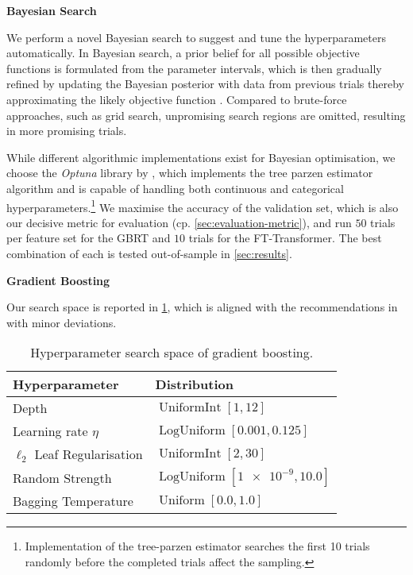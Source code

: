 \textbf{Bayesian Search}

We perform a novel Bayesian search to suggest and tune the hyperparameters automatically. In Bayesian search, a prior belief for all possible objective functions is formulated from the parameter intervals, which is then gradually refined by updating the Bayesian posterior with data from previous trials thereby approximating the likely objective function \autocite[][2]{shahriariTakingHumanOut2016}. Compared to brute-force approaches, such as grid search, unpromising search regions are omitted, resulting in more promising trials.

While different algorithmic implementations exist for Bayesian optimisation, we choose the \emph{Optuna} library by \textcite[][1--10]{akibaOptunaNextgenerationHyperparameter2019}, which implements the tree parzen estimator algorithm and is capable of handling both continuous and categorical hyperparameters.\footnote{Implementation of the tree-parzen estimator searches the first 10 trials randomly before the completed trials affect the sampling.} We maximise the accuracy of the validation set, which is also our decisive metric for evaluation (cp. \cref{sec:evaluation-metric}), and run $\num{50}$ trials per feature set for the \gls{GBRT} and $\num{10}$ trials for the FT-Transformer. The best combination of each is tested out-of-sample in \cref{sec:results}.

\textbf{Gradient Boosting}

Our search space is reported in \cref{tab:hyperparameter-space-gbm}, which is aligned with the recommendations in \textcites[][20]{prokhorenkovaCatBoostUnbiasedBoosting2018}[][18]{gorishniyRevisitingDeepLearning2021}[][4]{rubachevRevisitingPretrainingObjectives2022} with minor deviations.

\begin{table}[H]
    \centering
    \caption[Hyperparameter Search Space of Gradient Boosting]{Hyperparameter search space of gradient boosting.}
    \label{tab:hyperparameter-space-gbm}
    \begin{tabular}{@{}ll@{}}
        \toprule
        Hyperparameter               & Distribution                                  \\ \midrule
        Depth                        & $\operatorname{UniformInt}[1,12]$             \\
        Learning rate $\eta$         & $\operatorname{LogUniform}[0.001, 0.125]$     \\
        $\ell_2$ Leaf Regularisation & $\operatorname{UniformInt}[2, 30]$            \\
        Random Strength              & $\operatorname{LogUniform}[\num{1e-9}, 10.0]$ \\
        Bagging Temperature          & $\operatorname{Uniform}[0.0, 1.0]$            \\ \bottomrule
    \end{tabular}
\end{table}

